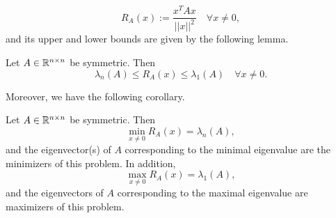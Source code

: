 \documentclass[10pt,a4paper]{article}
\begin{document}
\begin{equation*}
	R_A(x) := \frac{x^TAx}{||x||^2} \quad \forall x\neq 0,
\end{equation*}
and its upper and lower bounds are given by the following lemma.
\begin{lemma}
	Let $A\in \mathbb{R}^{n\times n}$ be symmetric. Then
	\begin{equation*}
		\lambda_n(A) \leq R_A(x) \leq \lambda_1(A) \quad \forall x\neq 0.
	\end{equation*}
\end{lemma}
Moreover, we have the following corollary.
\begin{lemma}
	Let $A\in \mathbb{R}^{n\times n}$ be symmetric. Then
	\begin{equation*}
		\min_{x\neq0} R_A(x) = \lambda_n(A),
	\end{equation*}
and the eigenvector(s) of $A$ corresponding to the minimal eigenvalue are the minimizers of this problem. In addition,
\begin{equation*}
	\max_{x\neq0} R_A(x) = \lambda_1(A),
\end{equation*}
and the eigenvectors of $A$ corresponding to the maximal eigenvalue are maximizers of this problem.
\end{lemma}
\end{document}
